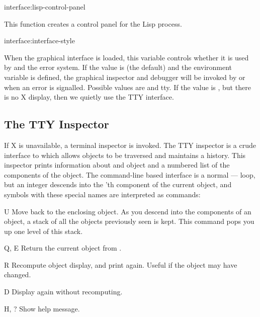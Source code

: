 \begin{defun}{interface:}{lisp-control-panel}{}
  
  This function creates a control panel for the Lisp process.
\end{defun}

\begin{defvar}{interface:}{interface-style}
  
  When the graphical interface is loaded, this variable controls
  whether it is used by  and the error system.  If the
  value is  (the default) and the 
  environment variable is defined, the graphical inspector and
  debugger will be invoked by  or when an error is
  signalled.  Possible values are  and {tty}.  If the
  value is , but there is no X display, then we quietly
  use the TTY interface.
\end{defvar}


\subsection{The TTY Inspector}

If X is unavailable, a terminal inspector is invoked.  The TTY inspector
is a crude interface to  which allows objects to be
traversed and maintains a history.  This inspector prints information
about and object and a numbered list of the components of the object.
The command-line based interface is a normal
---- loop, but an integer 
descends into the 'th component of the current object, and
symbols with these special names are interpreted as commands:

\begin{Lentry}
\item[U] Move back to the enclosing object.  As you descend into the
components of an object, a stack of all the objects previously seen is
kept.  This command pops you up one level of this stack.

\item[Q, E] Return the current object from .

\item[R] Recompute object display, and print again.  Useful if the
object may have changed.

\item[D] Display again without recomputing.

\item[H, ?] Show help message.
\end{Lentry}



